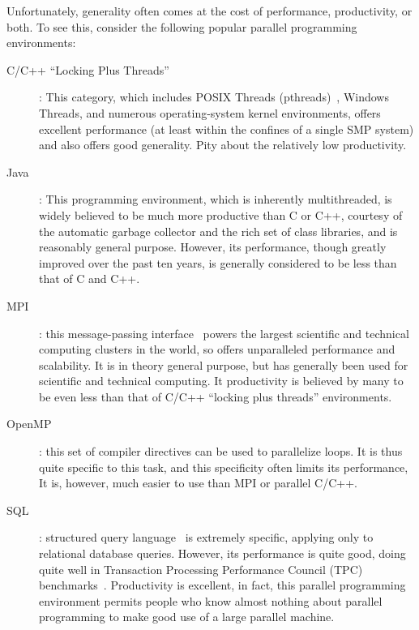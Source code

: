 Unfortunately, generality often comes at the cost of performance,
productivity, or both.
To see this, consider the following popular parallel programming
environments:

\begin{description}
\item[C/C++ ``Locking Plus Threads'']: This category, which includes
	POSIX Threads (pthreads)~\cite{OpenGroup1997pthreads},
	Windows Threads, and numerous
	operating-system kernel environments, offers excellent performance
	(at least within the confines of a single SMP system)
	and also offers good generality.
	Pity about the relatively low productivity.
\item[Java]: This programming environment, which is inherently
	multithreaded, is widely believed to be much more productive
	than C or C++, courtesy of the automatic garbage collector
	and the rich set of class libraries, and is reasonably
	general purpose.
	However, its performance, though greatly improved over the past ten
	years, is generally considered to be less than that of C and C++.
\item[MPI]: this message-passing interface~\cite{MPIForum2008} powers
	the largest scientific and technical computing clusters in
	the world, so offers unparalleled performance and scalability.
	It is in theory general purpose, but has generally been used
	for scientific and technical computing.
	It productivity is believed by many to be even less than that
	of C/C++ ``locking plus threads'' environments.
\item[OpenMP]: this set of compiler directives can be used
	to parallelize loops.  It is thus quite specific to this
	task, and this specificity often limits its performance,
	It is, however, much easier to use than MPI or parallel C/C++.
\item[SQL]: structured query language~\cite{DIS9075SQL92} is extremely
	specific, applying only to relational database queries.
	However, its performance is quite good, doing quite well
	in Transaction Processing Performance Council (TPC)
	benchmarks~\cite{TPC}.
	Productivity is excellent, in fact, this parallel programming
	environment permits people who know almost nothing about
	parallel programming to make good use of a large parallel
	machine.
\end{description}

